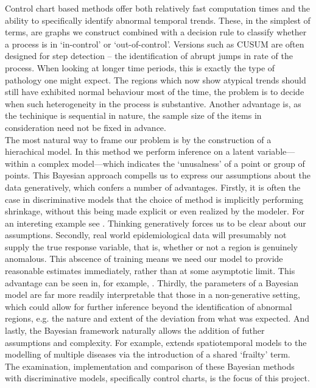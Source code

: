 \documentclass[11pt]{report}
\begin{document}
Control chart based methods offer both relatively fast computation times and the ability to specifically identify abnormal temporal trends. These, in the simplest of terms, are graphs we construct combined with a decision rule to classify whether a process is in `in-control' or `out-of-control'. Versions such as CUSUM are often designed for step detection -- the identification of abrupt jumps in rate of the process. When looking at longer time periods, this is exactly the type of pathology one might expect. The regions which now show atypical trends should still have exhibited normal behaviour most of the time, the problem is to decide when such heterogeneity in the process is substantive.  Another advantage is, as the techinique is sequential in nature, the sample size of the items in consideration need not be fixed in advance.  \\

The most natural way to frame our problem is by the construction of a hierachical model. In this method we perform inference on a latent variable---within a complex model---which indicates the `unusalness' of a point or group of points. This Bayesian approach compells us to express our assumptions about the data generatively, which confers a number of advantages. Firstly, it is often the case in discriminative models that the choice of method is implicitly performing shrinkage, without this being made explicit or even realized by the modeler. For an intereting example see \citet{stoch}. Thinking generatively forces us to be clear about our assumptions. Secondly, real world epidemiological data will presumably not supply the true response variable, that is, whether or not a region is genuinely anomalous. This abscence of training means we need our model to provide reasonable estimates immediately, rather than at some asymptotic limit. This advantage can be seen in, for example, \citet{ng}. Thirdly, the parameters of a Bayesian model are far more readily interpretable that those in a non-generative setting, which could allow for further inference beyond the identification of abnormal regions, e.g. the nature and extent of the deviation from what was expected. And lastly,
 the Bayesian framework naturally allows the addition of futher assumptions and complexity. For example, \citet{banerjee} extends spatiotemporal models to the modelling of multiple diseases via the introduction of a shared `frailty' term. \\

The examination, implementation and comparison of these Bayesian methods with discriminative models, specifically control charts, is the focus of this project. \\
\end{document}

